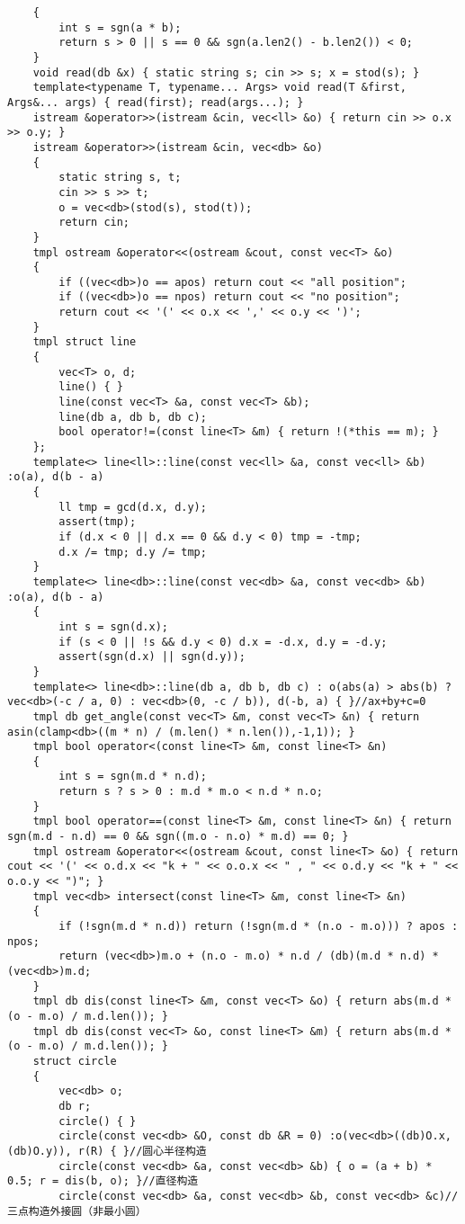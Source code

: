 \documentclass[12pt]{ctexart}
\begin{document}
\begin{lstlisting}
	{
		int s = sgn(a * b);
		return s > 0 || s == 0 && sgn(a.len2() - b.len2()) < 0;
	}
	void read(db &x) { static string s; cin >> s; x = stod(s); }
	template<typename T, typename... Args> void read(T &first, Args&... args) { read(first); read(args...); }
	istream &operator>>(istream &cin, vec<ll> &o) { return cin >> o.x >> o.y; }
	istream &operator>>(istream &cin, vec<db> &o)
	{
		static string s, t;
		cin >> s >> t;
		o = vec<db>(stod(s), stod(t));
		return cin;
	}
	tmpl ostream &operator<<(ostream &cout, const vec<T> &o)
	{
		if ((vec<db>)o == apos) return cout << "all position";
		if ((vec<db>)o == npos) return cout << "no position";
		return cout << '(' << o.x << ',' << o.y << ')';
	}
	tmpl struct line
	{
		vec<T> o, d;
		line() { }
		line(const vec<T> &a, const vec<T> &b);
		line(db a, db b, db c);
		bool operator!=(const line<T> &m) { return !(*this == m); }
	};
	template<> line<ll>::line(const vec<ll> &a, const vec<ll> &b) :o(a), d(b - a)
	{
		ll tmp = gcd(d.x, d.y);
		assert(tmp);
		if (d.x < 0 || d.x == 0 && d.y < 0) tmp = -tmp;
		d.x /= tmp; d.y /= tmp;
	}
	template<> line<db>::line(const vec<db> &a, const vec<db> &b) :o(a), d(b - a)
	{
		int s = sgn(d.x);
		if (s < 0 || !s && d.y < 0) d.x = -d.x, d.y = -d.y;
		assert(sgn(d.x) || sgn(d.y));
	}
	template<> line<db>::line(db a, db b, db c) : o(abs(a) > abs(b) ? vec<db>(-c / a, 0) : vec<db>(0, -c / b)), d(-b, a) { }//ax+by+c=0
	tmpl db get_angle(const vec<T> &m, const vec<T> &n) { return asin(clamp<db>((m * n) / (m.len() * n.len()),-1,1)); }
	tmpl bool operator<(const line<T> &m, const line<T> &n)
	{
		int s = sgn(m.d * n.d);
		return s ? s > 0 : m.d * m.o < n.d * n.o;
	}
	tmpl bool operator==(const line<T> &m, const line<T> &n) { return sgn(m.d - n.d) == 0 && sgn((m.o - n.o) * m.d) == 0; }
	tmpl ostream &operator<<(ostream &cout, const line<T> &o) { return cout << '(' << o.d.x << "k + " << o.o.x << " , " << o.d.y << "k + " << o.o.y << ")"; }
	tmpl vec<db> intersect(const line<T> &m, const line<T> &n)
	{
		if (!sgn(m.d * n.d)) return (!sgn(m.d * (n.o - m.o))) ? apos : npos;
		return (vec<db>)m.o + (n.o - m.o) * n.d / (db)(m.d * n.d) * (vec<db>)m.d;
	}
	tmpl db dis(const line<T> &m, const vec<T> &o) { return abs(m.d * (o - m.o) / m.d.len()); }
	tmpl db dis(const vec<T> &o, const line<T> &m) { return abs(m.d * (o - m.o) / m.d.len()); }
	struct circle
	{
		vec<db> o;
		db r;
		circle() { }
		circle(const vec<db> &O, const db &R = 0) :o(vec<db>((db)O.x, (db)O.y)), r(R) { }//圆心半径构造
		circle(const vec<db> &a, const vec<db> &b) { o = (a + b) * 0.5; r = dis(b, o); }//直径构造
		circle(const vec<db> &a, const vec<db> &b, const vec<db> &c)//三点构造外接圆（非最小圆）

\end{lstlisting}
\end{document}
